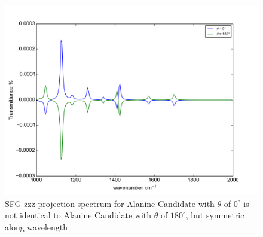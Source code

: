 \begin{figure}[!ht] 
\centering
\includegraphics[scale=0.7]{Figures/Ala_candidates_plotting_sfg_zzz_2.png}
\caption{SFG zzz projection spectrum for Alanine Candidate with $\theta$ of $0^{\circ}$ is not identical to Alanine Candidate with $\theta$ of $180^{\circ}$, but symmetric along wavelength} \label{fig:5.9}
\end{figure}

